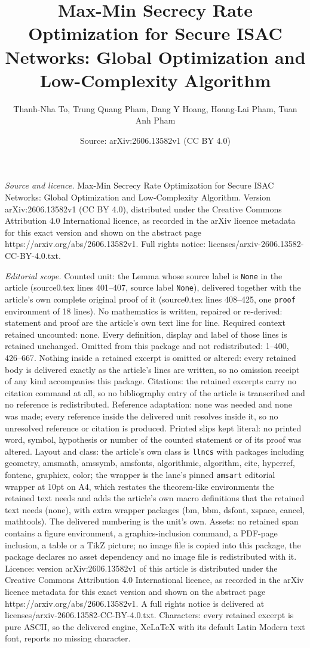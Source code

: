 \documentclass[10pt,a4paper]{amsart}
\title[Max-Min Secrecy Rate Optimization for Secure ISAC Networks: ]{Max-Min Secrecy Rate Optimization for Secure ISAC Networks: Global Optimization and Low-Complexity Algorithm}
\author{Thanh-Nha To, Trung Quang Pham, Dang Y Hoang, Hoang-Lai Pham, Tuan Anh Pham}
\date{Source: arXiv:2606.13582v1 (CC BY 4.0)}
\begin{document}
\maketitle

\noindent\emph{Source and licence.} Max-Min Secrecy Rate Optimization for Secure ISAC Networks: Global Optimization and Low-Complexity Algorithm. Version arXiv:2606.13582v1 (CC BY 4.0), distributed under the Creative Commons Attribution 4.0 International licence, as recorded in the arXiv licence metadata for this exact version and shown on the abstract page https://arxiv.org/abs/2606.13582v1. Full rights notice: licenses/arxiv-2606.13582-CC-BY-4.0.txt.\par\smallskip

\noindent\textit{Editorial scope.} Counted unit: the Lemma whose source label is \texttt{None} in the article (source0.tex lines 401--407, source label \texttt{None}), delivered together with the article's own complete original proof of it (source0.tex lines 408--425, one \texttt{proof} environment of 18 lines). No mathematics is written, repaired or re-derived: statement and proof are the article's own text line for line. Required context retained uncounted: none. Every definition, display and label of those lines is retained unchanged. Omitted from this package and not redistributed: 1--400, 426--667. Nothing inside a retained excerpt is omitted or altered: every retained body is delivered exactly as the article's lines are written, so no omission receipt of any kind accompanies this package. Citations: the retained excerpts carry no citation command at all, so no bibliography entry of the article is transcribed and no reference is redistributed. Reference adaptation: none was needed and none was made; every reference inside the delivered unit resolves inside it, so no unresolved reference or citation is produced. Printed slips kept literal: no printed word, symbol, hypothesis or number of the counted statement or of its proof was altered. Layout and class: the article's own class is \texttt{llncs} with packages including geometry, amsmath, amssymb, amsfonts, algorithmic, algorithm, cite, hyperref, fontenc, graphicx, color; the wrapper is the lane's pinned \texttt{amsart} editorial wrapper at 10pt on A4, which restates the theorem-like environments the retained text needs and adds the article's own macro definitions that the retained text needs (none), with extra wrapper packages (bm, bbm, dsfont, xspace, cancel, mathtools). The delivered numbering is the unit's own. Assets: no retained span contains a figure environment, a graphics-inclusion command, a PDF-page inclusion, a table or a TikZ picture; no image file is copied into this package, the package declares no asset dependency and no image file is redistributed with it. Licence: version arXiv:2606.13582v1 of this article is distributed under the Creative Commons Attribution 4.0 International licence, as recorded in the arXiv licence metadata for this exact version and shown on the abstract page https://arxiv.org/abs/2606.13582v1. A full rights notice is delivered at licenses/arxiv-2606.13582-CC-BY-4.0.txt. Characters: every retained excerpt is pure ASCII, so the delivered engine, XeLaTeX with its default Latin Modern text font, reports no missing character.
\end{document}
